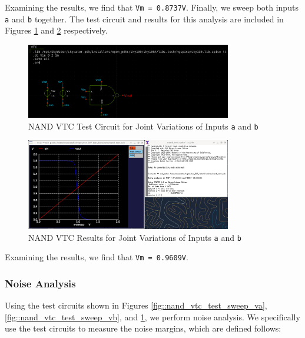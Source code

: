 \documentclass[fleqn]{article}
\begin{document}
	Examining the results, we find that \texttt{Vm = 0.8737V}. Finally, we sweep both inputs \texttt{a} and \texttt{b} together. The test circuit and results for this analysis are included in Figures \ref{fig::nand_vtc_test_sweep_va_vb} and \ref{fig::nand_vtc_sweep_va_vb} respectively.
	
	\begin{figure}[H]
		\centerline{\includegraphics[width=0.8\textwidth]{nand_vtc_test_sweep_va_vb.png}}
		\caption{NAND VTC Test Circuit for Joint Variations of Inputs \texttt{a} and \texttt{b}}
		\label{fig::nand_vtc_test_sweep_va_vb}
	\end{figure}
	
	\begin{figure}[H]
		\centerline{\includegraphics[width=0.8\textwidth]{nand_vtc_sweep_va_vb.png}}
		\caption{NAND VTC Results for Joint Variations of Inputs \texttt{a} and \texttt{b}}
		\label{fig::nand_vtc_sweep_va_vb}
	\end{figure}
	
	Examining the results, we find that \texttt{Vm = 0.9609V}.
	
	\subsubsection{Noise Analysis}
	\label{section::nand_noise_analysis}
	
	Using the test circuits shown in Figures \ref{fig::nand_vtc_test_sweep_va}, \ref{fig::nand_vtc_test_sweep_vb}, and \ref{fig::nand_vtc_test_sweep_va_vb}, we perform noise analysis. We specifically use the test circuits to measure the noise margins, which are defined follows:
	
\end{document}
